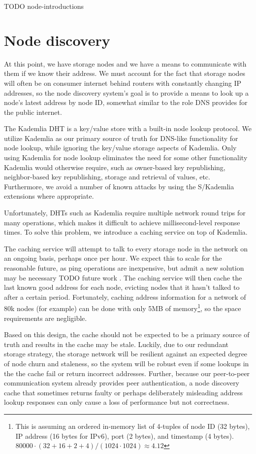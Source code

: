 \documentclass[11pt,fleqn,openany]{book}
\newcommand{\todo}[1]{{\color{red} TODO #1 }}
\begin{document}
\todo{node-introductions}

\section{Node discovery}\label{sec:concrete-node-discovery}

At this point, we have storage nodes and we have a means to communicate with
them if we know their address. We must account for the fact that storage nodes
will often be on consumer internet behind routers with constantly changing IP
addresses, so the node discovery system's goal is to provide a means to look
up a node's latest address by node ID, somewhat similar to the role DNS
provides for the public internet.

The Kademlia DHT is a key/value store with a built-in node lookup protocol.
We utilize Kademlia as our primary source of truth for DNS-like
functionality for node lookup, while ignoring the key/value storage aspects of
Kademlia.
Only using Kademlia for node lookup eliminates the need for some other
functionality Kademlia would otherwise require, such as owner-based key
republishing, neighbor-based key republishing, storage and retrieval of values,
etc. Furthermore, we avoid a number of known attacks by using the
S/Kademlia \cite{skad} extensions where appropriate.

Unfortunately, DHTs such as Kademlia require multiple network round trips for
many operations, which makes it difficult to achieve millisecond-level
response times. To solve this problem, we introduce a caching service on top
of Kademlia.

The caching service will attempt to talk to every storage node in the network
on an ongoing basis, perhaps once per hour. We expect this to scale for the
reasonable future, as ping operations are inexpensive, but admit a new solution
may be necessary \todo{future work}. The caching service will then cache
the last known good address for each node, evicting nodes that it hasn't talked
to after a certain period.
Fortunately, caching address information for a network of 80k nodes
(for example) can be done with only 5MB of memory\footnote{
This is assuming an ordered in-memory list of 4-tuples of node ID (32 bytes),
IP address (16 bytes for IPv6), port (2 bytes), and timestamp (4 bytes).
$80000\cdot(32+16+2+4)/(1024\cdot 1024) \approx 4.12$
}, so the space requirements
are negligible.

Based on this design, the cache should not be expected to be a primary source
of truth and results in the cache may be stale. Luckily, due to our redundant
storage strategy, the storage network will be resilient against an expected
degree of node churn and staleness,
so the system will be robust even if some lookups in the the cache
fail or return incorrect addresses.
Further, because our peer-to-peer communication
system already provides peer authentication, a node discovery cache that
sometimes returns faulty
or perhaps deliberately misleading address lookup responses can only cause a
loss of performance but not correctness.
\end{document}
